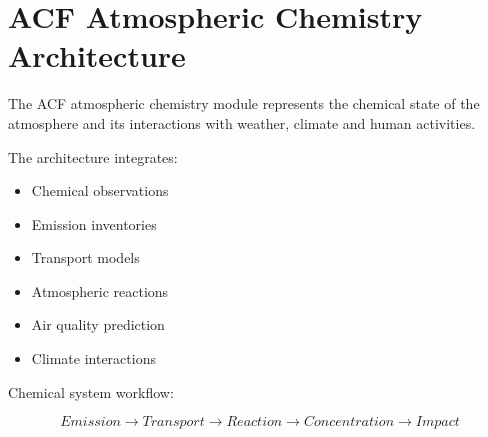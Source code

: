 \section{ACF Atmospheric Chemistry Architecture}


The ACF atmospheric chemistry module represents the chemical
state of the atmosphere and its interactions with weather,
climate and human activities.



The architecture integrates:


\begin{itemize}

\item Chemical observations

\item Emission inventories

\item Transport models

\item Atmospheric reactions

\item Air quality prediction

\item Climate interactions

\end{itemize}



Chemical system workflow:


\begin{equation}
Emission
\rightarrow
Transport
\rightarrow
Reaction
\rightarrow
Concentration
\rightarrow
Impact
\end{equation}
